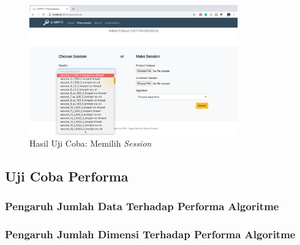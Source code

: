 \begin{figure}[H]
	\centering
	\includegraphics[width=9cm]{assets/img/bab4/hasil7.png}
	\caption{Hasil Uji Coba: Memilih \textit{Session}}
	\label{fig:hasil-performa7}
\end{figure}

\subsection{Uji Coba Performa}
\subsubsection{Pengaruh Jumlah Data Terhadap Performa Algoritme}

\subsubsection{Pengaruh Jumlah Dimensi Terhadap Performa Algoritme}